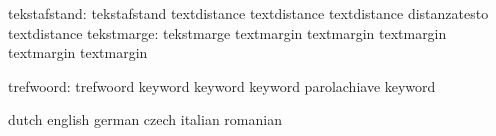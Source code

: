              tekstafstand: tekstafstand              textdistance
                           textdistance              textdistance
                           distanzatesto             textdistance %
               tekstmarge: tekstmarge                textmargin
                           textmargin                textmargin
                           textmargin                textmargin   %

trefwoord: trefwoord keyword
           keyword keyword
           parolachiave keyword



\stopconstants




\startvariables            dutch                     english
                           german                    czech
                           italian                   romanian

